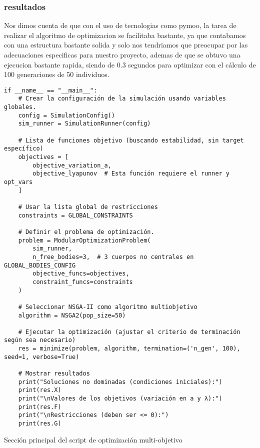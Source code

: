 \subsubsection{resultados}
Nos dimos cuenta de que con el uso de tecnologias como pymoo, la tarea de realizar el algoritmo de optimizacion se facilitaba bastante, ya que contabamos con una estructura bastante solida y solo nos tendriamos que preocupar por las adecuaciones especificas para nuestro proyecto, ademas de que se obtuvo una ejecucion bastante rapida, siendo de 0.3 segundos para optimizar con el cálculo de 100 generaciones de 50 individuos.

\begin{listing}[H]
\begin{verbatim}
if __name__ == "__main__":
    # Crear la configuración de la simulación usando variables globales.
    config = SimulationConfig()
    sim_runner = SimulationRunner(config)

    # Lista de funciones objetivo (buscando estabilidad, sin target específico)
    objectives = [
        objective_variation_a,
        objective_lyapunov  # Esta función requiere el runner y opt_vars
    ]

    # Usar la lista global de restricciones
    constraints = GLOBAL_CONSTRAINTS

    # Definir el problema de optimización.
    problem = ModularOptimizationProblem(
        sim_runner,
        n_free_bodies=3,  # 3 cuerpos no centrales en GLOBAL_BODIES_CONFIG
        objective_funcs=objectives,
        constraint_funcs=constraints
    )

    # Seleccionar NSGA-II como algoritmo multiobjetivo
    algorithm = NSGA2(pop_size=50)

    # Ejecutar la optimización (ajustar el criterio de terminación según sea necesario)
    res = minimize(problem, algorithm, termination=('n_gen', 100), seed=1, verbose=True)

    # Mostrar resultados
    print("Soluciones no dominadas (condiciones iniciales):")
    print(res.X)
    print("\nValores de los objetivos (variación en a y λ):")
    print(res.F)
    print("\nRestricciones (deben ser <= 0):")
    print(res.G)
\end{verbatim}
\caption{Sección principal del script de optimización multi-objetivo}
\label{lst:main_optimization}
\end{listing}
